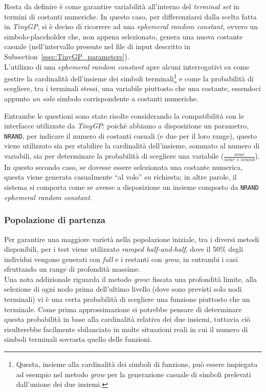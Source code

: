 \documentclass{../llncs}
\newcommand{\xss}[1]{\subsectionname~\ref{ssec:#1}}
\newcommand{\subsectionname}{Subsection}
\begin{document}
Resta da definire è come garantire variabilità all'interno del \emph{terminal set} in termini di costanti numeriche. In questo caso, per differenziarsi dalla scelta fatta in \emph{TinyGP}, si è deciso di ricorrere ad una \emph{ephemeral random constant}, ovvero un simbolo-placeholder che, non appena selezionato, genera una nuova costante casuale (nell'intervallo presente nel file di input descritto in \xss{TinyGP_parameters}).\\

L'utilizzo di una \emph{ephemeral random constant} apre alcuni interrogativi su come gestire la cardinalità dell'insieme dei simboli terminali\footnote{Questa, insieme alla cardinalità dei simboli di funzione, può essere impiegata ad esempio nel metodo \emph{grow} per la generazione casuale di simboli prelevati dall'unione dei due insiemi.} e come la probabilità di scegliere, tra i terminali stessi, una variabile piuttosto che una costante, essendoci appunto \emph{un solo} simbolo corrispondente a costanti numeriche.

Entrambe le questioni sono state risolte considerando la compatibilità con le interfacce utilizzate da \emph{TinyGP}: poiché abbiamo a disposizione un parametro, \texttt{NRAND}, per indicare il numero di costanti casuali (e due per il loro range), questo viene utilizzato sia per stabilire la cardinalità dell'insieme, sommato al numero di variabili, sia per determinare la probabilità di scegliere una variabile ($\frac{nvar}{nvar+nrand}$). In questo secondo caso, se dovesse essere selezionata una costante numerica, questa viene generata casualmente ``al volo'' su richiesta; in altre parole, il sistema si comporta come se avesse a disposizione un insieme composto da \texttt{NRAND} \emph{ephemeral random constant}.

\subsubsection{Popolazione di partenza}
Per garantire una maggiore varietà nella popolazione iniziale, tra i diversi metodi disponibili, per i test viene utilizzato \emph{ramped half-and-half}, dove il 50\% degli individui vengono generati con \emph{full} e i restanti con \emph{grow}, in entrambi i casi sfruttando un range di profondità massime.\\

Una nota addizionale riguarda il metodo \emph{grow}: fissata una profondità limite, alla selezione di ogni nodo prima dell'ultimo livello (dove sono previsti solo nodi terminali) vi è una certa probabilità di scegliere una funzione piuttosto che un terminale. Come prima approssimazione si potrebbe pensare di determinare questa probabilità in base alla cardinalità relativa dei due insiemi, tuttavia ciò risulterebbe facilmente sbilanciato in molte situazioni reali in cui il numero di simboli terminali sovrasta quello delle funzioni.
\end{document}

